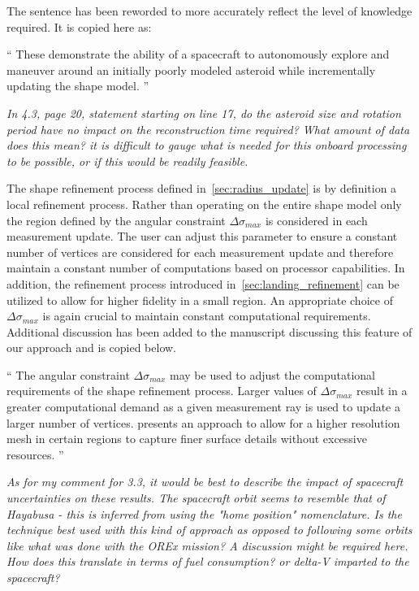 \documentclass[11pt]{article}
\newenvironment{correction}{\begin{list}{}{\setlength{\leftmargin}{1cm}\setlength{\rightmargin}{1cm}}\vspace{\parsep}\item[]``}{''\end{list}}
\newcommand{\comment}[1]{\item \itshape #1 \normalfont}
\begin{document}
\begin{itemize}
The sentence has been reworded to more accurately reflect the level of knowledge required.
It is copied here as:


\begin{correction}
These demonstrate the ability of a spacecraft to autonomously explore and maneuver around an initially poorly modeled asteroid while incrementally updating the shape model.
\end{correction}

\comment{
In 4.3, page 20, statement starting on line 17, do the asteroid size and rotation period have no impact on the reconstruction time required? 
What amount of data does this mean? 
it is difficult to gauge what is needed for this onboard processing to be possible, or if this would be readily feasible.
}

The shape refinement process defined in~\cref{sec:radius_update} is by definition a local refinement process.
Rather than operating on the entire shape model only the region defined by the angular constraint \( \Delta \sigma_{max}\) is considered in each measurement update. 
The user can adjust this parameter to ensure a constant number of vertices are considered for each measurement update and therefore maintain a constant number of computations based on processor capabilities. 
In addition, the refinement process introduced in~\cref{sec:landing_refinement} can be utilized to allow for higher fidelity in a small region.
An appropriate choice of \( \Delta \sigma_{max} \) is again crucial to maintain constant computational requirements.
Additional discussion has been added to the manuscript discussing this feature of our approach and is copied below.


\begin{correction}
    The angular constraint \( \Delta \sigma_{max} \) may be used to adjust the computational requirements of the shape refinement process.
    Larger values of \( \Delta \sigma_{max} \) result in a greater computational demand as a given measurement ray is used to update a larger number of vertices.
     presents an approach to allow for a higher resolution mesh in certain regions to capture finer surface details without excessive resources. 
\end{correction}

\comment{
As for my comment for 3.3, it would be best to describe the impact of spacecraft uncertainties on these results.
The spacecraft orbit seems to resemble that of Hayabusa - this is inferred from using the "home position" nomenclature. 
Is the technique best used with this kind of approach as opposed to following some orbits like what was done with the OREx mission? A discussion might be required here.
How does this translate in terms of fuel consumption? or delta-V imparted to the spacecraft?  
}


\end{itemize}
\end{document}
